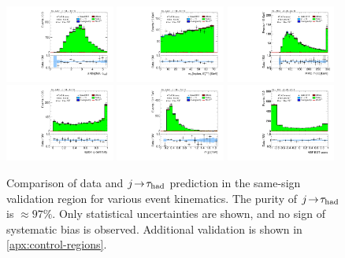 \begin{figure}[tp]
  \centering
  \includegraphics[width=0.32\textwidth]{figures/analysis/vbf-SSXCR/taulep-dR}
  \includegraphics[width=0.32\textwidth]{figures/analysis/vbf-SSXCR/mT}
  \includegraphics[width=0.32\textwidth]{figures/analysis/vbf-SSXCR/mMMC} \\
  \includegraphics[width=0.32\textwidth]{figures/analysis/vbf-SSXCR/lep-eta-centrality}
  \includegraphics[width=0.32\textwidth]{figures/analysis/vbf-SSXCR/dijet-m-veryhigh}
  \includegraphics[width=0.32\textwidth]{figures/analysis/vbf-SSXCR/BDTEve-VBF} \\
  \caption{Comparison of data and $j\!\rightarrow\!\tau_\text{had}$ prediction in the same-sign validation region for various event kinematics. The purity of $j\!\rightarrow\!\tau_\text{had}$ is $\approx\! 97\%$. Only statistical uncertainties are shown, and no sign of systematic bias is observed. Additional validation is shown in \cref{apx:control-regions}.}
  \label{fig:backgrounds-SSXCR}
\end{figure}

